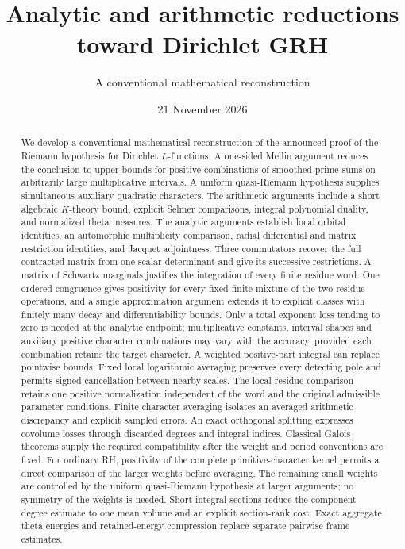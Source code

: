 
\title{Analytic and arithmetic reductions\\toward Dirichlet GRH}
\author{A conventional mathematical reconstruction}
\date{21 November 2026}

\maketitle
\begin{abstract}
We develop a conventional mathematical reconstruction of the announced
proof of the Riemann hypothesis for Dirichlet $L$-functions.
A one-sided Mellin argument reduces the conclusion to upper bounds for
positive combinations of smoothed prime sums on arbitrarily large
multiplicative intervals. A uniform quasi-Riemann hypothesis supplies
simultaneous auxiliary quadratic characters. The arithmetic arguments
include a short algebraic $K$-theory bound, explicit Selmer comparisons,
integral polynomial duality, and normalized theta measures. The analytic
arguments establish local orbital identities, an automorphic multiplicity
comparison, radial differential and matrix restriction identities, and
Jacquet adjointness. Three commutators recover the full contracted matrix
from one scalar determinant and give its successive restrictions.
A matrix of Schwartz marginals justifies the integration of every finite
residue word. One ordered congruence gives positivity for every fixed
finite mixture of the two residue operations, and a single approximation argument extends it to explicit
classes with finitely many decay and differentiability bounds.
Only a total exponent loss tending to zero is needed at the analytic
endpoint; multiplicative constants, interval shapes and auxiliary positive
character combinations may vary with the accuracy, provided each
combination retains the target character. A weighted positive-part integral
can replace pointwise bounds. Fixed local logarithmic averaging preserves
every detecting pole and permits signed cancellation between nearby scales.
The local residue comparison retains one positive
normalization independent of the word and the original admissible
parameter conditions.
Finite character averaging isolates an averaged arithmetic discrepancy
and explicit sampled errors. An exact orthogonal splitting expresses
covolume losses through discarded degrees and integral indices.
Classical Galois theorems supply the required compatibility after the
weight and period conventions are fixed.
For ordinary RH, positivity of the complete primitive-character kernel
permits a direct comparison of the larger weights before averaging.
The remaining small weights are controlled by the uniform quasi-Riemann
hypothesis at larger arguments; no symmetry of the weights is needed.
Short integral sections reduce the component degree estimate to one mean
volume and an explicit section-rank cost. Exact aggregate theta energies
and retained-energy compression replace separate pairwise frame estimates.


\end{abstract}
